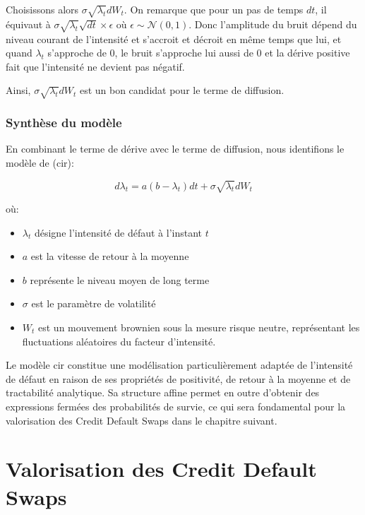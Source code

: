 Choisissons alors $\sigma \sqrt{\lambda_t} dW_t$. On remarque que pour un pas de temps $dt$, il équivaut à $\sigma \sqrt{\lambda_t} \sqrt{dt} \times \epsilon \text{ où } \epsilon \sim \mathcal{N}(0, 1)$. Donc l'amplitude du bruit dépend du niveau courant de l’intensité et s'accroit et décroit en même temps que lui, et quand $\lambda_t$ s'approche de 0, le bruit s'approche lui aussi de 0 et la dérive positive fait que l'intensité ne devient pas négatif.

Ainsi, $\sigma \sqrt{\lambda_t} dW_t$ est un bon candidat pour le terme de diffusion.


\subsection{Synthèse du modèle}

En combinant le terme de dérive avec le terme de diffusion, nous identifions le modèle de  (\gls{cir}):

\begin{equation}
    d\lambda_t = a(b - \lambda_t)dt + \sigma \sqrt{\lambda_t} dW_t
    \label{eq:cir}
\end{equation}

où:
\begin{itemize}
    \item $\lambda_t$ désigne l'intensité de défaut à l'instant $t$
    \item $a$ est la vitesse de retour à la moyenne
    \item $b$ représente le niveau moyen de long terme
    \item $\sigma$ est le paramètre de volatilité
    \item $W_t$ est un mouvement brownien sous la mesure risque neutre, représentant les fluctuations aléatoires du facteur d’intensité.
\end{itemize}

\bigskip

Le modèle \gls{cir} constitue une modélisation particulièrement adaptée de l’intensité de défaut en raison de ses propriétés de positivité, de retour à la moyenne et de tractabilité analytique. Sa structure affine permet en outre d’obtenir des expressions fermées des probabilités de survie, ce qui sera fondamental pour la valorisation des Credit Default Swaps dans le chapitre suivant.


\chapter{Valorisation des Credit Default Swaps}

